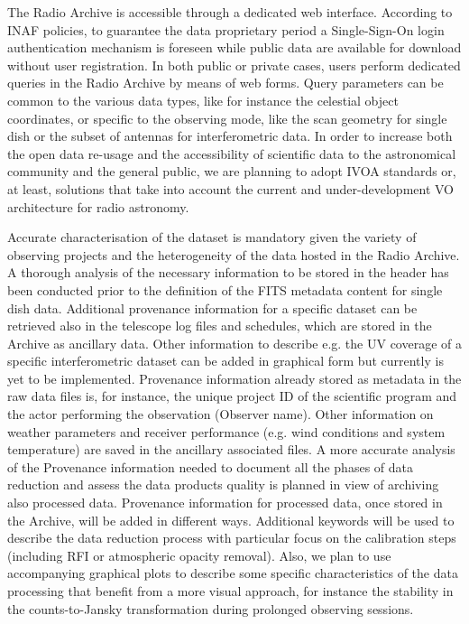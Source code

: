 \documentclass[11pt,a4paper]{ivoa}
\begin{document}
The Radio Archive is accessible through a dedicated web interface. According to INAF policies, to guarantee the data proprietary period a Single-Sign-On login authentication mechanism is foreseen while public data are available for download without user registration. In both public or private cases, users perform dedicated queries in the Radio Archive by means of web forms. Query parameters can be common to the various data types, like for instance the celestial object coordinates, or specific to the observing mode, like the scan geometry for single dish or the subset of antennas for interferometric data. In order to increase both the open data re-usage and the accessibility of scientific data to the astronomical community and the general public, we are planning to adopt IVOA standards or, at least, solutions that take into account the current and under-development VO architecture for radio astronomy.

Accurate characterisation of the dataset is mandatory given the variety of observing projects and the heterogeneity of the data hosted in the Radio Archive. A thorough analysis of the necessary information to be stored in the header has been conducted prior to the definition of the FITS metadata content for single dish data. Additional provenance information for a specific dataset can be retrieved also in the telescope log files and schedules, which are stored in the Archive as ancillary data. Other information to describe e.g. the UV coverage of a specific interferometric dataset can be added in graphical form but currently is yet to be implemented. Provenance information already stored as metadata in the raw data files is, for instance, the unique project ID of the scientific program and the actor performing the observation (Observer name). Other information on weather parameters and receiver performance (e.g. wind conditions and system temperature) are saved in the ancillary associated files.
A more accurate analysis of the Provenance information needed to document all the phases of data reduction and assess the data products quality is planned in view of archiving also processed data.  Provenance information for processed data, once stored in the Archive, will be added in different ways. Additional keywords will be used to describe the data reduction process with particular focus on the calibration steps (including RFI or atmospheric opacity removal). Also, we plan to use accompanying graphical plots to describe some specific characteristics of the data processing that benefit from a more visual approach, for instance the stability in the counts-to-Jansky transformation during prolonged observing sessions.
\end{document}
